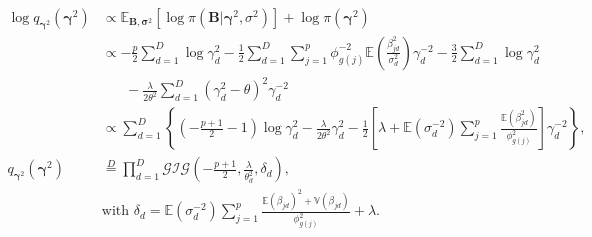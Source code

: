 \documentclass[a4paper,hidelinks]{article}\usepackage[]{graphicx}\usepackage[]{color}
\newcommand{\bsigma}{\bm{\sigma}}
\newcommand{\bgamma}{\bm{\gamma}}
\newcommand{\B}{\mathbf{B}}
\newcommand{\0}{\bm{0}}
\newcommand{\E}{\mathbb{E}}
\newcommand{\V}{\mathbb{V}}
\renewcommand{\(}{\left(}
\renewcommand{\)}{\right)}
\renewcommand{\[}{\left[}
\renewcommand{\]}{\right]}
\begin{document}
\begin{appendix}
		\begin{align*}
		\log q_{\bgamma^{2}}(\bgamma^{2}) & \propto \E_{\B, \bsigma^2} [\log \pi (\B | \bgamma^{2}, \sigma^2)] + \log \pi (\bgamma^{2}) \\
		& \propto -\frac{p}{2} \sum_{d=1}^D \log \gamma_d^{2} - \frac{1}{2} \sum_{d=1}^D \sum_{j=1}^p \phi_{g(j)}^{-2} \E \( \frac{\beta_{jd}^2}{\sigma^{2}_d}\) \gamma_d^{-2} - \frac{3}{2} \sum_{d=1}^D \log \gamma_d^{2} \\
		& \,\,\,\,\,\,\,\,\,\, - \frac{\lambda}{2 \theta^2} \sum_{d=1}^D (\gamma_d^2 - \theta)^2 \gamma_d^{-2} \\
		& \propto \sum_{d=1}^D \left\{ \( -\frac{p + 1}{2} - 1\) \log \gamma_d^{2} - \frac{\lambda}{2\theta^2} \gamma_d^2 - \frac{1}{2}\[ \lambda + \E(\sigma_d^{-2}) \sum_{j=1}^p \frac{\E(\beta_{jd}^2)}{\phi_{g(j)}^{2}}\] \gamma_d^{-2} \right\}, \\
		q_{\bgamma^{2}}(\bgamma^{2}) & \overset{D}{=} \prod_{d=1}^D \mathcal{GIG} \(-\frac{p+1}{2}, \frac{\lambda}{\theta_d^2}, \delta_{d} \), \\
		& \text{with } \delta_{d} =\E(\sigma_d^{-2}) \sum_{j=1}^p \frac{\E(\beta_{jd})^2 + \V(\beta_{jd})}{\phi_{g(j)}^2} + \lambda.
		\end{align*}
		

		

\end{appendix}
\end{document}
